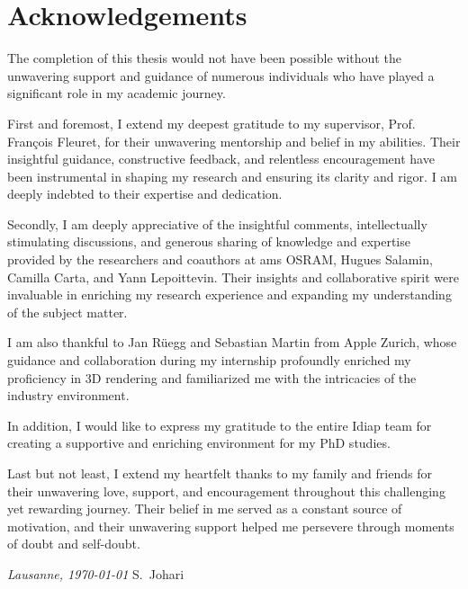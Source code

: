 \chapter*{Acknowledgements}
The completion of this thesis would not have been possible without the unwavering support and guidance of numerous individuals who have played a significant role in my academic journey.

\vspace{2ex}
First and foremost, I extend my deepest gratitude to my supervisor, Prof. François Fleuret, for their unwavering mentorship and belief in my abilities. Their insightful guidance, constructive feedback, and relentless encouragement have been instrumental in shaping my research and ensuring its clarity and rigor. I am deeply indebted to their expertise and dedication.

\vspace{2ex}
Secondly, I am deeply appreciative of the insightful comments, intellectually stimulating discussions, and generous sharing of knowledge and expertise provided by the researchers and coauthors at ams OSRAM, Hugues Salamin, Camilla Carta, and Yann Lepoittevin. Their insights and collaborative spirit were invaluable in enriching my research experience and expanding my understanding of the subject matter.

\vspace{2ex}
I am also thankful to Jan Rüegg and Sebastian Martin from Apple Zurich, whose guidance and collaboration during my internship profoundly enriched my proficiency in 3D rendering and familiarized me with the intricacies of the industry environment.

\vspace{2ex}
In addition, I would like to express my gratitude to the entire Idiap team for creating a supportive and enriching environment for my PhD studies.

\vspace{2ex}
Last but not least, I extend my heartfelt thanks to my family and friends for their unwavering love, support, and encouragement throughout this challenging yet rewarding journey. Their belief in me served as a constant source of motivation, and their unwavering support helped me persevere through moments of doubt and self-doubt.

\bigskip
 
\noindent\textit{Lausanne, \today}
\hfill S.~Johari
